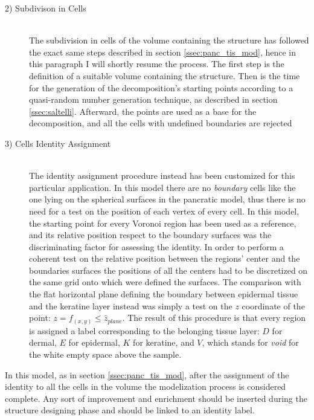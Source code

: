 \begin{description}
        \item [2) Subdivison in Cells] \hfill \\
        The subdivision in cells of the volume containing the structure has followed the exact same steps described in section \ref{ssec:panc_tis_mod}, hence in this paragraph I will shortly resume the process. The first step is the definition of a suitable volume containing the structure. Then is the time for the generation of the decomposition's starting points according to a quasi-random number generation technique, as described in section \ref{ssec:saltelli}. Afterward, the points are used as a base for the decomposition, and all the cells with undefined boundaries are rejected

        \item [3) Cells Identity Assignment] \hfill \\
        The identity assignment procedure instead has been customized for this particular application. In this model there are no \textit{boundary} cells like the one lying on the spherical surfaces in the pancratic model, thus there is no need for a test on the position of each vertex of every cell. In this model, the starting point for every Voronoi region has been used as a reference, and its relative position respect to the boundary surfaces was the discriminating factor for assessing the identity. In order to perform a coherent test on the relative position between the regions' center and the boundaries surfaces the positions of all the centers had to be discretized on the same grid onto which were defined the surfaces. The comparison with the flat horizontal plane defining the boundary between epidermal tissue and the keratine layer instead was simply a test on the $z$ coordinate of the point: $z = f_{(x,y)} \leq \hat{z}_{plane}$. The result of this procedure is that every region is assigned a label corresponding to the belonging tissue layer: $D$ for dermal, $E$ for epidermal, $K$ for keratine, and $V$, which stands for \textit{void} for the white empty space above the sample.

    \end{description}

    In this model, as in section \ref{ssec:panc_tis_mod}, after the assignment of the identity to all the cells in the volume the modelization process is considered complete. Any sort of improvement and enrichment should be inserted during the structure designing phase and should be linked to an identity label.
